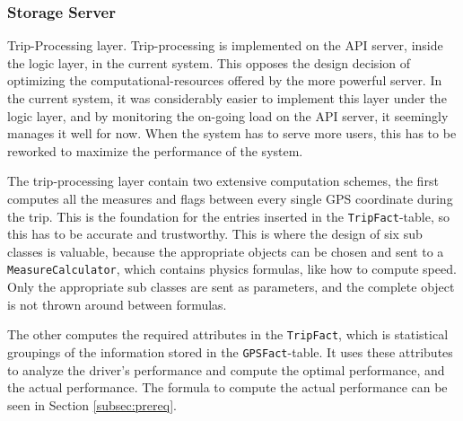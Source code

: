 \subsubsection{Storage Server}\label{subsec:impl_storage_server}
Trip-Processing layer.
Trip-processing is implemented on the API server, inside the logic layer, in the current system. This opposes the design decision of optimizing the computational-resources offered by the more powerful server. In the current system, it was considerably easier to implement this layer under the logic layer, and by monitoring the on-going load on the API server, it seemingly manages it well for now. When the system has to serve more users, this has to be reworked to maximize the performance of the system. 

The trip-processing layer contain two extensive computation schemes, the first computes all the measures and flags between every single GPS coordinate during the trip. This is the foundation for the entries inserted in the \texttt{TripFact}-table, so this has to be accurate and trustworthy. This is where the design of six sub classes is valuable, because the appropriate objects can be chosen and sent to a \texttt{MeasureCalculator}, which contains physics formulas, like how to compute speed. Only the appropriate sub classes are sent as parameters, and the complete object is not thrown around between formulas.

The other computes the required attributes in the \texttt{TripFact}, which is statistical groupings of the information stored in the \texttt{GPSFact}-table. It uses these attributes to analyze the driver's performance and compute the optimal performance, and the actual performance. The formula to compute the actual performance can be seen in Section \ref{subsec:prereq}.